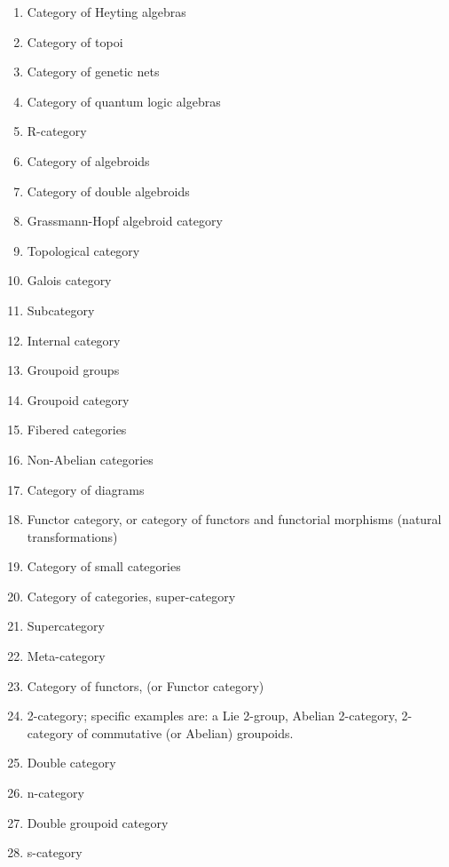 \documentclass[12pt]{article}
\theoremstyle{plain}
\theoremstyle{definition}
\numberwithin{equation}{section}
\begin{document}
\begin{enumerate}
\item Category of Heyting algebras
\item Category of topoi
\item Category of genetic nets
\item Category of quantum logic algebras
\item R-category
\item Category of algebroids
\item Category of double algebroids
\item Grassmann-Hopf algebroid category
\item Topological category
\item Galois category 
\item Subcategory
\item Internal category
\item Groupoid groups
\item Groupoid category
\item Fibered categories
\item Non-Abelian categories
\item Category of diagrams
\item Functor category, or category of functors and functorial morphisms (natural transformations)
\item Category of small categories
\item Category of categories, super-category
\item Supercategory
\item Meta-category
\item Category of functors, (or Functor category)
\item 2-category; specific examples are: a Lie 2-group, Abelian 2-category, 
2-category of commutative (or Abelian) groupoids.
\item Double category
\item n-category
\item Double groupoid category
\item s-category 
\end{enumerate}


\end{document}

